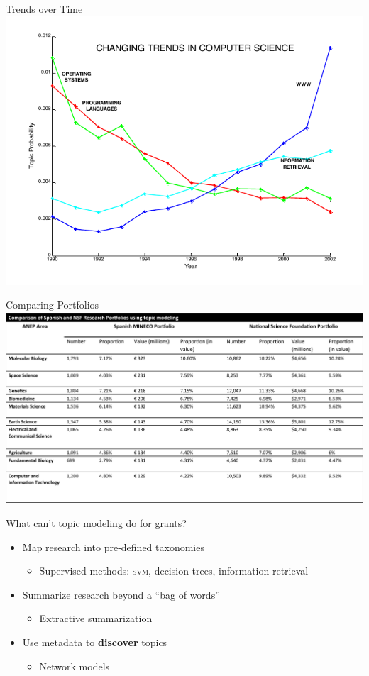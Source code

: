 \begin{frame}{Trends over Time}
  \includegraphics[width=1.0\linewidth]{topic_models/cs_trends}
\end{frame}

\begin{frame}{Comparing Portfolios}
  \includegraphics[width=1.0\linewidth]{topic_models/spain_comparison}
\end{frame}

\begin{frame}{What can't topic modeling do for grants?}
  \begin{itemize}
    \item Map research into pre-defined taxonomies 
      \begin{itemize}
        \item Supervised methods: \textsc{svm}, decision trees, information retrieval
      \end{itemize}
    \item Summarize research beyond a ``bag of words''
      \begin{itemize}
        \item Extractive summarization
      \end{itemize}      
    \item Use metadata to {\bf discover} topics 
      \begin{itemize}
        \item Network models
      \end{itemize}
  \end{itemize}
\end{frame}

